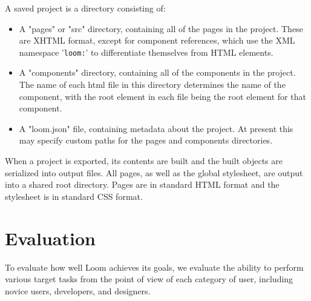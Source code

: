 \documentclass[conference, letterpaper]{IEEEtran}
\begin{document}
A saved project is a directory consisting of:
\begin{itemize}
  \item A "pages" or "src" directory, containing all of the pages in the project. These are XHTML format, except for component references, which use the XML namespace '\texttt{loom:}' to differentiate themselves from HTML elements.
  \item A "components" directory, containing all of the components in the project. The name of each html file in this directory determines the name of the component, with the root element in each file being the root element for that component.
  \item A "loom.json" file, containing metadata about the project. At present this may specify custom paths for the pages and components directories.
\end{itemize}

When a project is exported, its contents are built and the built objects are serialized into output files. All pages, as well as the global stylesheet, are output into a shared root directory. Pages are in standard HTML format and the stylesheet is in standard CSS format.

\section{Evaluation}
To evaluate how well Loom achieves its goals, we evaluate the ability to perform various target tasks from the point of view of each category of user, including novice users, developers, and designers.
\end{document}
